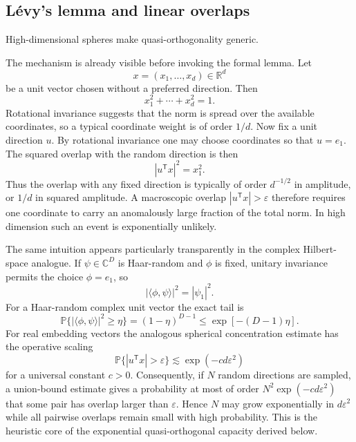 \documentclass[
  aps,
  reprint,
  superscriptaddress,
  floatfix,
  nofootinbib,
  longbibliography
]{revtex4-2}
\newcommand{\R}{\mathbb{R}}
\newcommand{\Prob}{\mathbb{P}}
\newcommand{\T}{^{\mathsf{T}}}
\begin{document}
\subsection{L\'evy's lemma and linear overlaps}
\label{sec:levy}

High-dimensional spheres make quasi-orthogonality generic.

The mechanism is already visible before invoking the formal lemma.  Let
\[
        x=(x_1,\ldots,x_d)\in\R^d
\]
be a unit vector chosen without a preferred direction.  Then
\[
        x_1^2+\cdots+x_d^2=1 .
\]
Rotational invariance suggests that the norm is spread over the available
coordinates, so a typical coordinate weight is of order $1/d$.  Now fix a
unit direction $u$.  By rotational invariance one may choose coordinates so
that $u=e_1$.  The squared overlap with the random direction is then
\[
        |u\T x|^2=x_1^2 .
\]
Thus the overlap with any fixed direction is typically of order $d^{-1/2}$
in amplitude, or $1/d$ in squared amplitude.  A macroscopic overlap
$|u\T x|>\varepsilon$ therefore requires one coordinate to carry an
anomalously large fraction of the total norm.  In high dimension such an
event is exponentially unlikely.

The same intuition appears particularly transparently in the complex
Hilbert-space analogue.  If $\psi\in\mathbb{C}^D$ is Haar-random and
$\phi$ is fixed, unitary invariance permits the choice $\phi=e_1$, so
\[
        |\langle\phi,\psi\rangle|^2=|\psi_1|^2 .
\]
For a Haar-random complex unit vector the exact tail is
\[
        \Prob\{ |\langle\phi,\psi\rangle|^2\geq\eta\}
        =(1-\eta)^{D-1}
        \leq \exp[-(D-1)\eta] .
\]
For real embedding vectors the analogous spherical concentration estimate
has the operative scaling
\[
        \Prob\{ |u\T x|>\varepsilon\}
        \lesssim \exp(-c d\varepsilon^2)
\]
for a universal constant $c>0$.  Consequently, if $N$ random directions are
sampled, a union-bound estimate gives a probability at most of order
$N^2\exp(-c d\varepsilon^2)$ that some pair has overlap larger than
$\varepsilon$.  Hence $N$ may grow exponentially in $d\varepsilon^2$ while
all pairwise overlaps remain small with high probability.  This is the
heuristic core of the exponential quasi-orthogonal capacity derived below.
\end{document}
